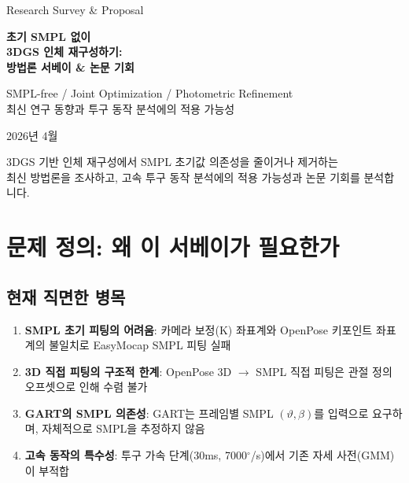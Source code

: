 \documentclass[11pt, a4paper]{report}
\begin{document}
\begin{titlepage}
\centering
\vspace*{1.5cm}
{\Large\color{gray} Research Survey \& Proposal}
\vspace{0.5cm}

{\Huge\bfseries\color{defblue} 초기 SMPL 없이\\[0.3cm]
3DGS 인체 재구성하기:\\[0.3cm]
방법론 서베이 \& 논문 기회}

\vspace{1cm}

{\LARGE\color{defblue!70!black} SMPL-free / Joint Optimization / Photometric Refinement\\
최신 연구 동향과 투구 동작 분석에의 적용 가능성}

\vspace{3cm}
{\large 2026년 4월}

\vspace{\fill}
{\small\color{gray} 3DGS 기반 인체 재구성에서 SMPL 초기값 의존성을 줄이거나 제거하는\\
최신 방법론을 조사하고, 고속 투구 동작 분석에의 적용 가능성과 논문 기회를 분석합니다.}
\end{titlepage}

\tableofcontents
\newpage


\chapter{문제 정의: 왜 이 서베이가 필요한가}

\section{현재 직면한 병목}

\begin{enumerate}[leftmargin=*]
  \item \textbf{SMPL 초기 피팅의 어려움}: 카메라 보정(K) 좌표계와 OpenPose 키포인트 좌표계의 불일치로 EasyMocap SMPL 피팅 실패
  \item \textbf{3D 직접 피팅의 구조적 한계}: OpenPose 3D $\rightarrow$ SMPL 직접 피팅은 관절 정의 오프셋으로 인해 수렴 불가
  \item \textbf{GART의 SMPL 의존성}: GART는 프레임별 SMPL $(\vartheta, \beta)$를 입력으로 요구하며, 자체적으로 SMPL을 추정하지 않음
  \item \textbf{고속 동작의 특수성}: 투구 가속 단계(30ms, 7000$^\circ$/s)에서 기존 자세 사전(GMM)이 부적합
\end{enumerate}
\end{document}
